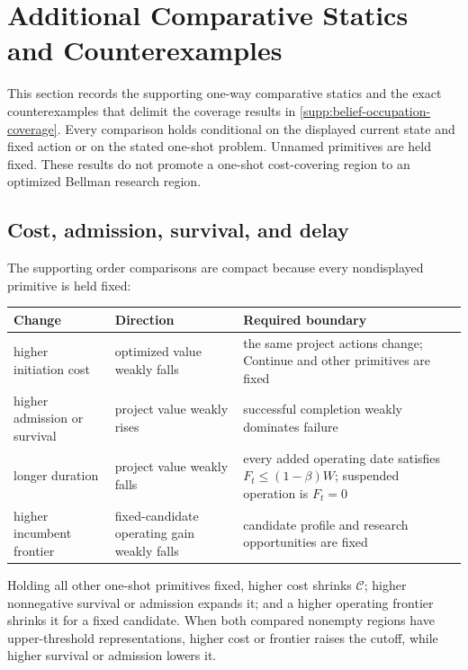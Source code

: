 \section{Additional Comparative Statics and Counterexamples}
\label{supp:additional-comparative-statics}\label{app:counterexamples}

This section records the supporting one-way comparative statics and the exact
counterexamples that delimit the coverage results in
\cref{supp:belief-occupation-coverage}.  Every comparison holds conditional
on the displayed current state and fixed action or on the stated one-shot
problem.  Unnamed primitives are held fixed.  These results do not promote a
one-shot cost-covering region to an optimized Bellman research region.

\subsection{Cost, admission, survival, and delay}

The supporting order comparisons are compact because every nondisplayed
primitive is held fixed:
\begin{center}
\small
\renewcommand{\arraystretch}{1.08}
\begin{tabular}{@{}>{\raggedright\arraybackslash}p{}
                    >{\raggedright\arraybackslash}p{}
                    >{\raggedright\arraybackslash}p{}@{}}
\toprule
Change & Direction & Required boundary \\
\midrule
higher initiation cost
  & optimized value weakly falls
  & the same project actions change; Continue and other primitives are fixed \\
higher admission or survival
  & project value weakly rises
  & successful completion weakly dominates failure \\
longer duration
  & project value weakly falls
  & every added operating date satisfies
    \(F_t\le(1-\beta)W\); suspended operation is \(F_t=0\) \\
higher incumbent frontier
  & fixed-candidate operating gain weakly falls
  & candidate profile and research opportunities are fixed \\
\bottomrule
\end{tabular}
\end{center}

\begin{proposition}
\label{prop:one-shot-cutoff-comparative-statics}
Holding all other one-shot primitives fixed, higher cost shrinks
\(\mathcal C\); higher nonnegative survival or admission expands it; and a
higher operating frontier shrinks it for a fixed candidate.  When both
compared nonempty regions have upper-threshold representations, higher cost
or frontier raises the cutoff, while higher survival or admission lowers it.
\end{proposition}

